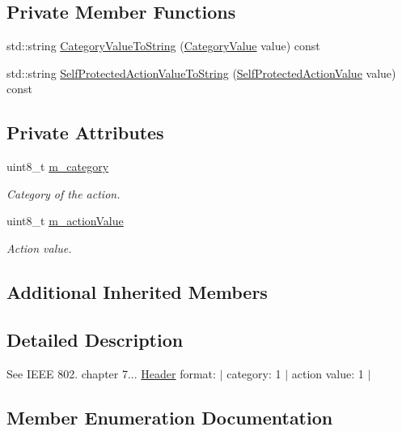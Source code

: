 \subsection*{Private Member Functions}
\begin{DoxyCompactItemize}
\item 
std\+::string \hyperlink{classns3_1_1WifiActionHeader_ac2411999e840f1d644f046f43cbf0d9d}{Category\+Value\+To\+String} (\hyperlink{classns3_1_1WifiActionHeader_a5402becd11b4077f22d76c4d0d923358}{Category\+Value} value) const 
\item 
std\+::string \hyperlink{classns3_1_1WifiActionHeader_a390bc1ecd2567963d703cc86f32fb285}{Self\+Protected\+Action\+Value\+To\+String} (\hyperlink{classns3_1_1WifiActionHeader_a17cfd6c8f685a44e7b7b832cc9a53e83}{Self\+Protected\+Action\+Value} value) const 
\end{DoxyCompactItemize}
\subsection*{Private Attributes}
\begin{DoxyCompactItemize}
\item 
uint8\+\_\+t \hyperlink{classns3_1_1WifiActionHeader_a1e5b62e2dc8a7ad8edc62d56a2cdd866}{m\+\_\+category}
\begin{DoxyCompactList}\small\item\em Category of the action. \end{DoxyCompactList}\item 
uint8\+\_\+t \hyperlink{classns3_1_1WifiActionHeader_a632dce10add5a500d2e541b975b55702}{m\+\_\+action\+Value}
\begin{DoxyCompactList}\small\item\em Action value. \end{DoxyCompactList}\end{DoxyCompactItemize}
\subsection*{Additional Inherited Members}


\subsection{Detailed Description}
See I\+E\+EE 802. chapter 7... \hyperlink{classns3_1_1Header}{Header} format\+: $\vert$ category\+: 1 $\vert$ action value\+: 1 $\vert$ 

\subsection{Member Enumeration Documentation}
